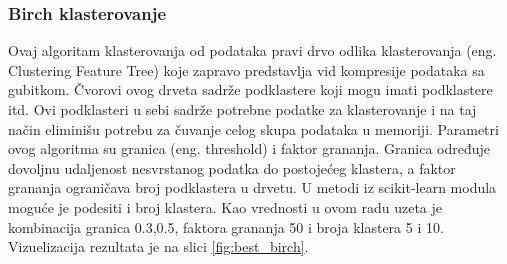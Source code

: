 \documentclass{article}
\begin{document}
\begin{table}[h!]
\caption{ Rezultati klasterovanja koriscenjem hijerarhijskog klasterovanja i ward-ove veze: prema ocenama, ubedljivo je najbolje klasterovanje za 3 klastera u datoteci GSM3308814. Ni ovde nema nekih pravilnosti u odnosu na izbor rastojanja. }
\label{tab:birch-results}
\end{table}

\subsubsection{Birch klasterovanje}

Ovaj algoritam klasterovanja od podataka pravi drvo odlika klasterovanja (eng. Clustering Feature Tree) koje zapravo predstavlja vid kompresije podataka sa gubitkom. Čvorovi ovog drveta sadrže podklastere koji mogu imati podklastere itd. Ovi podklasteri u sebi sadrže potrebne podatke za klasterovanje i na taj način eliminišu potrebu za čuvanje celog skupa podataka u memoriji. Parametri ovog algoritma su granica (eng. threshold) i faktor grananja. Granica određuje dovoljnu udaljenost nesvrstanog podatka do postojećeg klastera, a faktor grananja ograničava broj podklastera u drvetu. U metodi iz scikit-learn modula moguće je podesiti i broj klastera. Kao vrednosti u ovom radu uzeta je kombinacija granica 0.3,0.5, faktora grananja 50 i broja klastera 5 i 10. Vizuelizacija rezultata je na slici \ref{fig:best_birch}.
\end{document}
